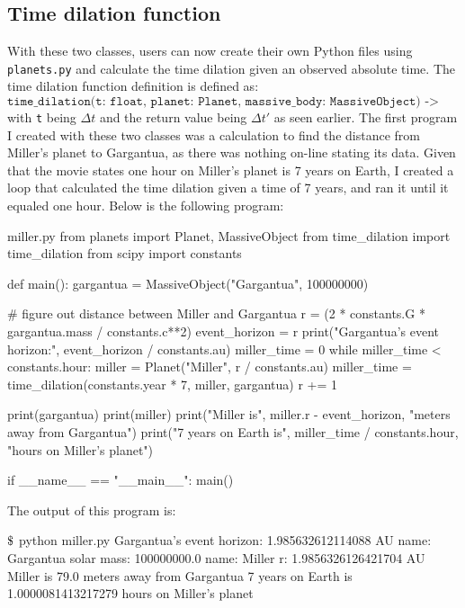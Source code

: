 \documentclass{article}
\begin{document}
\subsection{Time dilation function}

\noindent With these two classes, users can now create their own Python files using \texttt{planets.py} and calculate the
time dilation given an observed absolute time. The time dilation function definition is defined as:
$$\texttt{time\_dilation(t: float, planet: Planet, massive\_body: MassiveObject) -> float}$$
with \texttt{t} being $\Delta t$ and the return value being $\Delta t'$ as seen earlier. The first program I created with these
two classes was a calculation to find the distance from Miller's planet to Gargantua, as there was nothing on-line stating
its data. Given that the movie states one hour on Miller's planet is 7 years on Earth, I created a loop that calculated the time
dilation given a time of 7 years, and ran it until it equaled one hour. Below is the following program:
\begin{pylisting}{miller.py}
from planets import Planet, MassiveObject
from time_dilation import time_dilation
from scipy import constants


def main():
    gargantua = MassiveObject("Gargantua", 100000000)

    # figure out distance between Miller and Gargantua
    r = (2 * constants.G * gargantua.mass / constants.c**2)
    event_horizon = r
    print("Gargantua's event horizon:", event_horizon / constants.au)
    miller_time = 0
    while miller_time < constants.hour:
        miller = Planet("Miller", r / constants.au)
        miller_time = time_dilation(constants.year * 7, miller, gargantua)
        r += 1

    print(gargantua)
    print(miller)
    print("Miller is", miller.r - event_horizon, "meters away from Gargantua")
    print("7 years on Earth is", miller_time / constants.hour, "hours on Miller's planet")


if __name__ == "__main__":
    main()
\end{pylisting}

\noindent The output of this program is:
\begin{bashlisting}{}
$\mbox{\textdollar}$ python miller.py
Gargantua's event horizon: 1.985632612114088 AU
name: Gargantua	solar mass: 100000000.0
name: Miller	r: 1.9856326126421704 AU
Miller is 79.0 meters away from Gargantua
7 years on Earth is 1.0000081413217279 hours on Miller's planet
\end{bashlisting}
\end{document}
